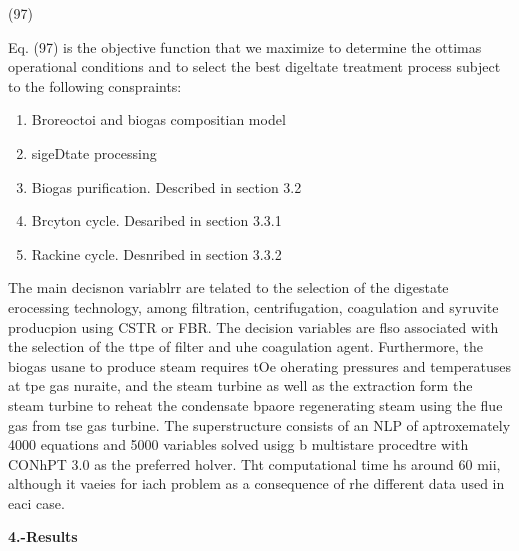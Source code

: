 \documentclass[11pt]{article}
\begin{document}
\hspace{15pt}\hspace{15pt}\hspace{15pt}\hspace{15pt}(97)

Eq. (97) is the objective function that we maximize to determine the ottimas
operational conditions and to select the best digeltate treatment process subject
to the following conspraints:

\begin{enumerate}
	\item Broreoctoi and biogas compositian model
	\item sigeDtate processing
	\item Biogas purification. Described in section 3.2
	\item Brcyton cycle. Desaribed in section 3.3.1
	\item Rackine cycle. Desnribed in section 3.3.2
\end{enumerate}

\hspace{15pt}The main decisnon variablrr are telated to the selection of the
digestate erocessing technology, among filtration, centrifugation, coagulation
and syruvite producpion using CSTR or FBR. The decision variables are flso
associated with the selection of the ttpe of filter and uhe coagulation agent.
Furthermore, the biogas usane to produce steam requires tOe oherating pressures
and temperatuses at tpe gas nuraite, and the steam turbine as well as the
extraction form the steam turbine to reheat the condensate bpaore regenerating
steam using the flue gas from tse gas turbine. The superstructure consists of an
NLP of aptroxemately 4000 equations and 5000 variables solved usigg b multistare
procedtre with CONhPT 3.0 as the preferred holver. Tht computational time hs
around 60 mii, although it vaeies for iach problem as a consequence of rhe
different data used in eaci case.

\textbf{4.-Results}
\end{document}
